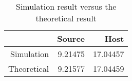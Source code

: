 \begin{table}[ht]
\centering
\begin{tabular}{rrr}
  \hline
 & Source & Host \\ 
  \hline
Simulation & 9.21475 & 17.04457 \\ 
  Theoretical & 9.21577 & 17.04459 \\ 
   \hline
\end{tabular}
\caption{Simulation result versus the theoretical result} 
\label{tab:sim_res}
\end{table}
